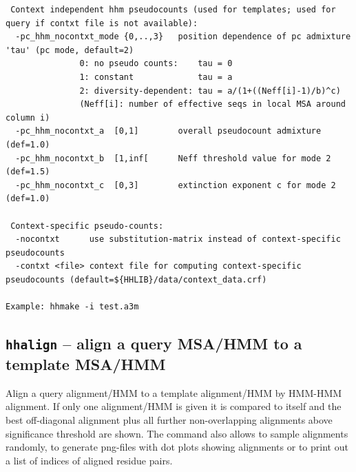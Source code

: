 \documentclass[11pt,a4paper]{article}
\begin{document}
\begin{verbatim}
 Context independent hhm pseudocounts (used for templates; used for query if contxt file is not available):
  -pc_hhm_nocontxt_mode {0,..,3}   position dependence of pc admixture 'tau' (pc mode, default=2) 
               0: no pseudo counts:    tau = 0                                  
               1: constant             tau = a                                  
               2: diversity-dependent: tau = a/(1+((Neff[i]-1)/b)^c)            
               (Neff[i]: number of effective seqs in local MSA around column i) 
  -pc_hhm_nocontxt_a  [0,1]        overall pseudocount admixture (def=1.0)                        
  -pc_hhm_nocontxt_b  [1,inf[      Neff threshold value for mode 2 (def=1.5)                      
  -pc_hhm_nocontxt_c  [0,3]        extinction exponent c for mode 2 (def=1.0)                     

 Context-specific pseudo-counts:                                                  
  -nocontxt      use substitution-matrix instead of context-specific pseudocounts 
  -contxt <file> context file for computing context-specific pseudocounts (default=${HHLIB}/data/context_data.crf)

Example: hhmake -i test.a3m 
\end{verbatim} 
\normalsize



\subsection{{\tt hhalign} -- align a query MSA/HMM to a template MSA/HMM}

Align a query alignment/HMM to a template alignment/HMM by HMM-HMM alignment.
If only one alignment/HMM is given it is compared to itself and the best
off-diagonal alignment plus all further non-overlapping alignments above 
significance threshold are shown. The command also allows to sample
alignments randomly, to generate png-files with dot plots showing 
alignments or to print out a list of indices of aligned residue pairs. 
\end{document}

